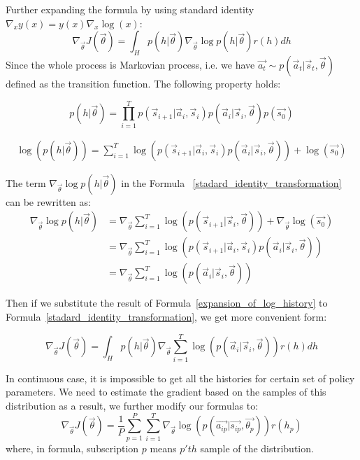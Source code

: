 \documentclass[officiallayout]{tktla}
\begin{document}
Further expanding the formula by using standard identity $\nabla_x y(x) = y(x) \nabla_x \log(x)$:
\begin{equation}
\nabla_{\vec{\theta}} J(\vec{\theta}) = \int_H p(h|\vec{\theta}) \nabla_{\vec{\theta}} \log p(h|\vec{\theta})r(h)dh
\label{stadard_identity_transformation}
\end{equation}
Since the whole process is Markovian process, i.e. we have $ \vec{a_{t}}\sim p(\vec{a}_{t}|\vec{s}_{t},\vec{\theta})$ defined as the transition function. The following property holds: 

\begin{equation}
p(h|\vec{\theta}) = \prod_{i=1}^Tp(\vec{s}_{i+1}|\vec{a}_i, \vec{s}_i)p(\vec{a}_{i}|\vec{s}_{i}, \vec{\theta})p(\vec{s_0})
\label{markov_property}
\end{equation}

\begin{align}
\log(p(h|\vec{\theta})) = \sum_{i=1}^T\log(p(\vec{s}_{i+1}|\vec{a}_i, \vec{s}_i)p(\vec{a}_{i}|\vec{s}_{i}, \vec{\theta})) + \log(\vec{s_0})
\label{log_markov_property}
\end{align}

The term $\nabla_{\vec{\theta}} \log p(h|\vec{\theta})$ in the Formula ~\ref{stadard_identity_transformation} can be rewritten as:
\begin{align}
\nabla_{\vec{\theta}} \log p(h|\vec{\theta})  &= \nabla_{\vec{\theta}} \sum_{i=1}^T\log(p(\vec{s}_{i+1}|\vec{s}_{i}, \vec{\theta})) + \nabla_{\vec{\theta}} \log(\vec{s_0}) \\
&= \nabla_{\vec{\theta}} \sum_{i=1}^T\log(p(\vec{s}_{i+1}|\vec{a}_i, \vec{s}_i)p(\vec{a}_{i}|\vec{s}_{i}, \vec{\theta})) \\
&= \nabla_{\vec{\theta}} \sum_{i=1}^T\log(p(\vec{a}_{i}|\vec{s}_{i}, \vec{\theta}))
\label{expansion_of_log_history}
\end{align}

Then if we substitute the result of Formula~\ref{expansion_of_log_history} to Formula~\ref{stadard_identity_transformation}, we get more convenient form:


\begin{equation}
\nabla_{\vec{\theta}} J(\vec{\theta}) = \int_H p(h|\vec{\theta}) \nabla_{\vec{\theta}} \sum_{i=1}^T\log(p(\vec{a}_{i}|\vec{s}_{i}, \vec{\theta}))r(h)dh
\label{standard_identity_transformation}
\end{equation}

In continuous case, it is impossible to get all the histories for certain set of policy parameters. We need to estimate the gradient based on the samples of this distribution as a result, we further modify our formulas to:
\begin{equation}
\nabla_{\vec{\theta}} J(\vec{\theta}) = \frac{1}{P}\sum_{p=1}^P  \sum_{i=1}^T\nabla_{\vec{\theta}}\log(p(\vec{a_{ip}}|\vec{s_{ip}}, \vec{\theta_p}))r(h_p)
\label{pgpe_policy}
\end{equation}
where, in formula, subscription $p$ means $p'th$ sample of the distribution.
\end{document}
